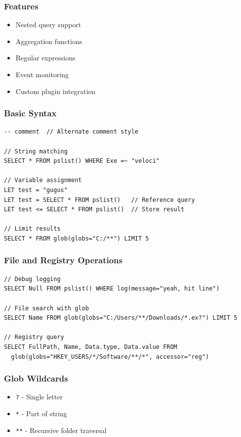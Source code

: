 \subsubsection*{Features}
\begin{itemize}
   \item Nested query support
   \item Aggregation functions
   \item Regular expressions
   \item Event monitoring
   \item Custom plugin integration
\end{itemize}

\subsubsection*{Basic Syntax}
\begin{lstlisting}[basicstyle=\ttfamily]
-- comment  // Alternate comment style

// String matching
SELECT * FROM pslist() WHERE Exe =~ "veloci"

// Variable assignment
LET test = "gugus"
LET test = SELECT * FROM pslist()   // Reference query
LET test <= SELECT * FROM pslist()  // Store result

// Limit results
SELECT * FROM glob(globs="C:/**") LIMIT 5
\end{lstlisting}

\subsubsection*{File and Registry Operations}
\begin{lstlisting}[basicstyle=\ttfamily]
// Debug logging
SELECT Null FROM pslist() WHERE log(message="yeah, hit line")

// File search with glob
SELECT Name FROM glob(globs="C:/Users/**/Downloads/*.ex?") LIMIT 5

// Registry query
SELECT FullPath, Name, Data.type, Data.value FROM 
  glob(globs="HKEY_USERS/*/Software/**/*", accessor="reg")
\end{lstlisting}

\subsubsection*{Glob Wildcards}
\begin{itemize}
    \item \texttt{?} - Single letter
    \item \texttt{*} - Part of string
    \item \texttt{**} - Recursive folder traversal
\end{itemize}

